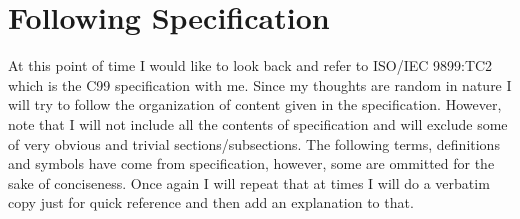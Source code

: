 \chapter{Following Specification}
\startcolumns[n=3,distance=2em]
  \placelist
    [section]
    [alternative=c, %
     interaction=all,]
\stopcolumns


At this point of time I would like to look back and refer to ISO/IEC
9899:TC2 which is the C99 specification with me. Since my thoughts are
random in nature I will try to follow the organization of content
given in the specification. However, note that I will not include all
the contents of specification and will exclude some of very obvious
and trivial sections/subsections. The following terms, definitions and
symbols have come from specification, however, some are ommitted for
the sake of conciseness. Once again I will repeat that at times I will
do a verbatim copy just for quick reference and then add an
explanation to that.

